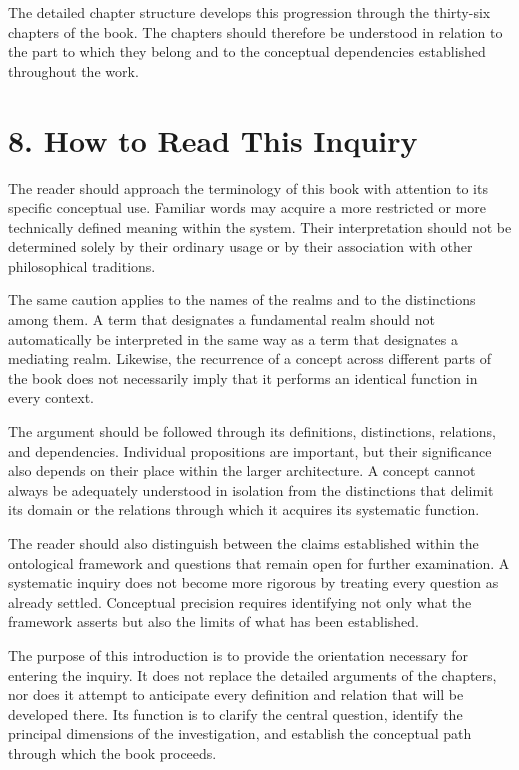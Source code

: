 The detailed chapter structure develops this progression
through the thirty-six chapters of the book. The chapters
should therefore be understood in relation to the part
to which they belong and to the conceptual dependencies
established throughout the work.


\section*{8. How to Read This Inquiry}

The reader should approach the terminology of this
book with attention to its specific conceptual use.
Familiar words may acquire a more restricted or more
technically defined meaning within the system. Their
interpretation should not be determined solely by
their ordinary usage or by their association with
other philosophical traditions.

The same caution applies to the names of the realms
and to the distinctions among them. A term that
designates a fundamental realm should not automatically
be interpreted in the same way as a term that designates
a mediating realm. Likewise, the recurrence of a concept
across different parts of the book does not necessarily
imply that it performs an identical function in every
context.

The argument should be followed through its definitions,
distinctions, relations, and dependencies. Individual
propositions are important, but their significance
also depends on their place within the larger architecture.
A concept cannot always be adequately understood in
isolation from the distinctions that delimit its domain
or the relations through which it acquires its systematic
function.

The reader should also distinguish between the claims
established within the ontological framework and
questions that remain open for further examination.
A systematic inquiry does not become more rigorous
by treating every question as already settled.
Conceptual precision requires identifying not only
what the framework asserts but also the limits of
what has been established.

The purpose of this introduction is to provide the
orientation necessary for entering the inquiry. It
does not replace the detailed arguments of the chapters,
nor does it attempt to anticipate every definition
and relation that will be developed there. Its function
is to clarify the central question, identify the
principal dimensions of the investigation, and establish
the conceptual path through which the book proceeds.

